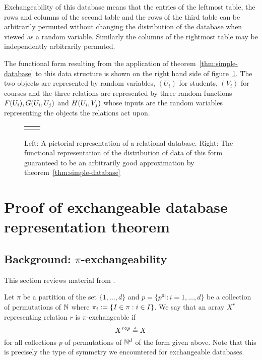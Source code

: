 Exchangeability of this database means that the entries of the leftmost table, the rows and columns of the second table and the rows of the third table can be arbitrarily permuted without changing the distribution of the database when viewed as a random variable.
Similarly the columns of the rightmost table may be independently arbitrarily permuted.

The functional form resulting from the application of theorem~\ref{thm:simple-database} to this data structure is shown on the right hand side of figure~\ref{fig:multi-rel-seq}.
The two objects are represented by \iid random variables, $(U_i)$ for students, $(V_i)$ for courses and the three relations are represented by three random functions $F(U_i),G(U_i,U_j)$ and $H(U_i,V_j)$ whose inputs are the random variables representing the objects the relations act upon.

\begin{figure}[ht]
\centering
\begin{tabular}{cc}
\tiny  & \tiny 
\end{tabular}
\caption{Left: A pictorial representation of a relational database. Right: The functional representation of the distribution of data of this form guaranteed to be an arbitrarily good approximation by theorem~\ref{thm:simple-database}}
\label{fig:multi-rel-seq}
\end{figure}

\section{Proof of exchangeable database representation theorem}
\label{sec:proof_database}

\subsection{Background: $\pi$-exchangeability}

This section reviews material from .

Let $\pi$ be a partition of the set $\{1,\dots,d\}$ and $p = \{p^{\pi_i} : i = 1,\dots,d\}$ be a collection of permutations of $\mathbb{N}$ where $\pi_i := \{I \in \pi : i \in I\}$.
We say that an array $X^r$ representing relation $r$ is $\pi$-exchangeable if 
\begin{equation}
  X^{r\circ p} \overset{\,_{\!d}}{=} X
\end{equation}
for all collections $p$ of permutations of $\mathbb{N}^d$ of the form given above.
Note that this is precisely the type of symmetry we encountered for exchangeable databases.

